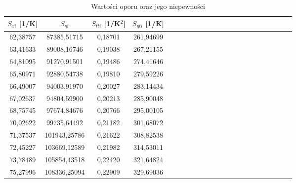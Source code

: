 \documentclass[10pt,a4paper]{article}
\begin{document}
\begin{center}
\begin{center}
 \begin{table}[h!]
 \centering
 \caption{Wartości oporu oraz jego niepewności}
 \label{t6}
 \begin{tabular}{|c|c|c|c|c|c|c|c|c|c|c|c|c|c|c|c|c|c|c|c|c|c|}
 \hline
 $S_{xi}$ [1/K]& $S_{\eta i}$ & $S_{tti}$ [1/K$^2$]&$S_{\eta ti}$ [1/K]\\
 \hline
62,38757                    & 87385,51715                   & 0,18701                                      & 261,94699                   \\ \hline
63,41633                    & 89008,16746                   & 0,19038                                      & 267,21155                   \\ \hline
64,81095                    & 91270,91501                   & 0,19486                                      & 274,41646                   \\ \hline
65,80971                    & 92880,54738                   & 0,19810                                      & 279,59226                   \\ \hline
66,49007                    & 94003,91970                   & 0,20027                                      & 283,14434                   \\ \hline
67,02637                    & 94804,59900                   & 0,20213                                      & 285,90048                   \\ \hline
68,75745                    & 97674,84676                   & 0,20766                                      & 295,00105                   \\ \hline
70,02622                    & 99735,64492                   & 0,21182                                      & 301,68072                   \\ \hline
71,37537                    & 101943,25786                  & 0,21622                                      & 308,82538                   \\ \hline
72,45227                    & 103669,12589                  & 0,21982                                      & 314,53011                   \\ \hline
73,78489                    & 105854,43518                  & 0,22420                                      & 321,64824                   \\ \hline
75,27996                    & 108336,25094                  & 0,22909                                      & 329,69036                   \\ \hline

\end{tabular}
\end{table}
\end{center}
\end{center}
\end{document}
